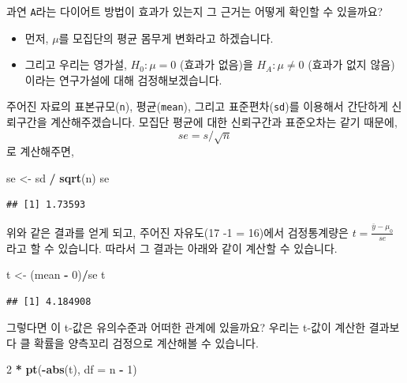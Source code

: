 \documentclass[]{book}
\newenvironment{Shaded}{\begin{snugshade}}{\end{snugshade}}
\newcommand{\DataTypeTok}[1]{\textcolor[rgb]{0.13,0.29,0.53}{#1}}
\newcommand{\DecValTok}[1]{\textcolor[rgb]{0.00,0.00,0.81}{#1}}
\newcommand{\KeywordTok}[1]{\textcolor[rgb]{0.13,0.29,0.53}{\textbf{#1}}}
\newcommand{\NormalTok}[1]{#1}
\newcommand{\OperatorTok}[1]{\textcolor[rgb]{0.81,0.36,0.00}{\textbf{#1}}}
\newcommand{\StringTok}[1]{\textcolor[rgb]{0.31,0.60,0.02}{#1}}
\begin{document}
과연 \texttt{A}라는 다이어트 방법이 효과가 있는지 그 근거는 어떻게 확인할 수 있을까요?

\begin{itemize}
\item
  먼저, \(\mu\)를 모집단의 평균 몸무게 변화라고 하겠습니다.
\item
  그리고 우리는 영가설, \(H_0: \mu = 0\) (효과가 없음)을 \(H_A: \mu \neq 0\) (효과가 없지 않음)이라는 연구가설에 대해 검정해보겠습니다.
\end{itemize}

주어진 자료의 표본규모(\texttt{n}), 평균(\texttt{mean}), 그리고 표준편차(\texttt{sd})를 이용해서 간단하게 신뢰구간을 계산해주겠습니다. 모집단 평균에 대한 신뢰구간과 표준오차는 같기 때문에, \[se = s / \sqrt{n}\]로 계산해주면,

\begin{Shaded}
\begin{Highlighting}[]
\NormalTok{se <-}\StringTok{ }\NormalTok{sd }\OperatorTok{/}\StringTok{ }\KeywordTok{sqrt}\NormalTok{(n)}
\NormalTok{se}
\end{Highlighting}
\end{Shaded}

\begin{verbatim}
## [1] 1.73593
\end{verbatim}

위와 같은 결과를 얻게 되고, 주어진 자유도(17 -1 = 16)에서 검정통계량은 \(t = \frac{\bar{y}-\mu_0}{se}\)라고 할 수 있습니다. 따라서 그 결과는 아래와 같이 계산할 수 있습니다.

\begin{Shaded}
\begin{Highlighting}[]
\NormalTok{t <-}\StringTok{ }\NormalTok{(mean }\OperatorTok{-}\StringTok{ }\DecValTok{0}\NormalTok{)}\OperatorTok{/}\NormalTok{se}
\NormalTok{t}
\end{Highlighting}
\end{Shaded}

\begin{verbatim}
## [1] 4.184908
\end{verbatim}

그렇다면 이 t-값은 유의수준과 어떠한 관계에 있을까요? 우리는 t-값이 계산한 결과보다 클 확률을 양측꼬리 검정으로 계산해볼 수 있습니다.

\begin{Shaded}
\begin{Highlighting}[]
\DecValTok{2} \OperatorTok{*}\StringTok{ }\KeywordTok{pt}\NormalTok{(}\OperatorTok{-}\KeywordTok{abs}\NormalTok{(t), }\DataTypeTok{df =}\NormalTok{ n }\OperatorTok{-}\StringTok{ }\DecValTok{1}\NormalTok{)}
\end{Highlighting}
\end{Shaded}
\end{document}
